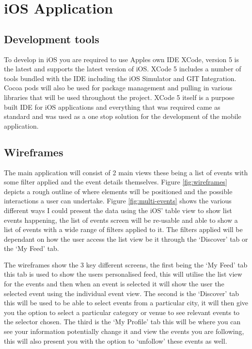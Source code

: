 	\section{iOS Application}

		\subsection{Development tools}
			To develop in iOS you are required to use Apples own IDE XCode, version 5 is the latest and supports the latest version of iOS. XCode 5 includes a number of tools bundled with the IDE including the iOS Simulator and GIT Integration. Cocoa pods will also be used for package management and pulling in various libraries that will be used throughout the project. XCode 5 itself is a purpose built IDE for iOS applications and everything that was required came as standard and was used as a one stop solution for the development of the mobile application. 

		\subsection{Wireframes}
			The main application will consist of 2 main views these being a list of events with some filter applied and the event details themselves. Figure \ref{fig:wireframes} depicts a rough outline of where elements will be positioned and the possible interactions a user can undertake. Figure \ref{fig:multi-events} shows the various different ways I could present the data using the iOS' table view to show list events happening, the list of events screen will be re-usable and able to show a list of events with a wide range of filters applied to it. The filters applied will be dependant on how the user access the list view be it through the `Discover' tab or the `My Feed' tab. 

			The wireframes show the 3 key different screens, the first being the `My Feed' tab  this tab is used to show the users personalised feed, this will utilise the list view for the events and then when an event is selected it will show the user the selected event using the individual event view. The second is the `Discover' tab this will be used to be able to select events from a particular city, it will then give you the option to select a particular category or venue to see relevant events to the selector chosen. The third is the `My Profile' tab this will be where you can see your information potentially change it and view the events you are following, this will also present you with the option to `unfollow' these events as well.

